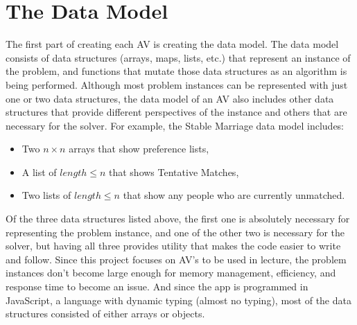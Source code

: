 \section{The Data Model}
\hspace{-0.26in}
The first part of creating each AV is creating the data model. 
The data model consists of 
data structures (arrays, maps, lists, etc.)
that represent an instance of the problem, 
and functions that mutate those data structures as an algorithm is being performed. 
Although most problem instances can be represented with just one or two data structures, 
the data model of an AV also includes other data structures that 
provide different perspectives of the instance and others that are necessary for the solver.
For example, the Stable Marriage data model includes: 
\begin{itemize}
	\item Two $n \times n$ arrays that show preference lists, 
	\item A list of $length \leq n$ that shows Tentative Matches, 
	\item Two lists of $length \leq n$ that show any people who are currently unmatched. 
\end{itemize}
Of the three data structures listed above, the first one is absolutely necessary for 
representing the problem instance, 
and one of the other two is necessary for the solver, but having all three
provides utility that makes the code easier to write and follow.
\newline\newline
Since this project focuses on AV's to be used in lecture, 
the problem instances don't become large enough for 
memory management, efficiency, and response time 
to become an issue. 
And since the app is programmed in JavaScript, 
a language with dynamic typing (almost no typing), most of the data structures 
consisted of either arrays or objects.
%
